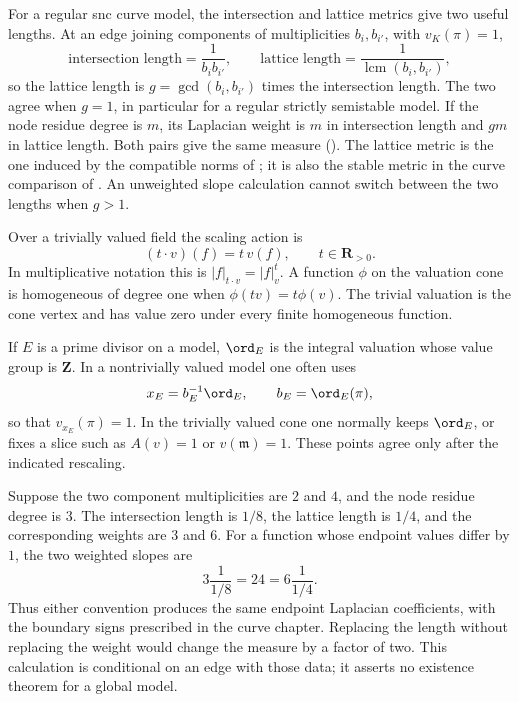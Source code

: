 For a regular snc curve model, the intersection and lattice
metrics give two useful lengths.  At an edge joining components
of multiplicities \(b_i,b_{i'}\), with \(v_K(\pi)=1\),
\begin{equation*}
 \text{intersection length}=\frac1{b_ib_{i'}},
 \qquad
 \text{lattice length}
   =\frac1{\operatorname{lcm}(b_i,b_{i'})},
 \tag{J.2a}\label{eq:appJ-edge-lengths}
\end{equation*}
so the lattice length is \(g=\gcd(b_i,b_{i'})\) times the
intersection length.  The two agree when \(g=1\), in particular
for a regular strictly semistable model.
If the node residue degree is \(m\), its Laplacian weight is \(m\)
in intersection length and \(gm\) in lattice length.
Both pairs give the same measure
().
The lattice metric is the one induced by the compatible norms
of ; it is also the stable metric
in the curve comparison of .
An unweighted slope calculation cannot switch between the two
lengths when \(g>1\).

Over a trivially valued field the scaling action is
\begin{equation*}
 (t\cdot v)(f)=t\,v(f),\qquad t\in\mathbf R_{>0}.
 \tag{J.3}\label{eq:appJ-scaling-action}
\end{equation*}
In multiplicative notation this is \(|f|_{t\cdot v}=|f|_v^t\).  A function
\(\phi\) on the valuation cone is homogeneous of degree one when
\(\phi(t v)=t\phi(v)\).  The trivial valuation is the cone vertex and has
value zero under every finite homogeneous function.

\begin{remark}
\label{rem:appJ-divisorial-normalizations}
If \(E\) is a prime divisor on a model, \(\ord_E\) is the integral valuation
whose value group is \(\mathbf Z\).  In a nontrivially valued model one often
uses
\[
 x_E=b_E^{-1}\ord_E,
 \qquad b_E=\ord_E(\pi),
\]
so that \(v_{x_E}(\pi)=1\).  In the trivially valued cone one normally keeps
\(\ord_E\), or fixes a slice such as \(A(v)=1\) or \(v(\mathfrak m)=1\).
These points agree only after the indicated rescaling.
\end{remark}

\begin{example}
\label{ex:appJ-edge-normalization}
Suppose the two component multiplicities are \(2\) and \(4\), and the
node residue degree is \(3\). The intersection length is \(1/8\), the
lattice length is \(1/4\), and the corresponding weights are \(3\) and
\(6\). For a function whose endpoint values differ by \(1\), the two
weighted slopes are
\[
                   3\frac{1}{1/8}=24
                   =6\frac{1}{1/4}.
\]
Thus either convention produces the same endpoint Laplacian coefficients,
with the boundary signs prescribed in the curve chapter. Replacing the
length without replacing the weight would change the measure by a factor
of two. This calculation is conditional on an edge with those data; it
asserts no existence theorem for a global model.
\end{example}

